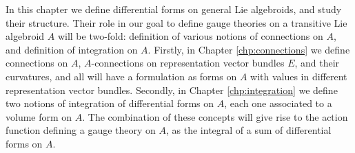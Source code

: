             
        
        
        


In this chapter we define differential forms on general Lie algebroids, and study their structure. Their role in our goal to define gauge theories on a transitive Lie algebroid $A$ will be two-fold: definition of various notions of connections on $A$, and definition of integration on $A$. Firstly, in Chapter \ref{chp:connections} we define connections on $A$, $A$-connections on representation vector bundles $E$, and their curvatures, and all will have a formulation as forms on $A$ with values in different representation vector bundles. Secondly, in Chapter \ref{chp:integration} we define two notions of integration of differential forms on $A$, each one associated to a volume form on $A$. The combination of these concepts will give rise to the action function defining a gauge theory on $A$, as the integral of a sum of differential forms on $A$.

